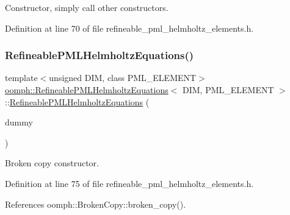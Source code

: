 Constructor, simply call other constructors. 



Definition at line 70 of file refineable\+\_\+pml\+\_\+helmholtz\+\_\+elements.\+h.

\mbox{\label{classoomph_1_1RefineablePMLHelmholtzEquations_a3ee7236f173edb1144cf75fd9f12e7b8}} 
\subsubsection{\texorpdfstring{Refineable\+P\+M\+L\+Helmholtz\+Equations()}{RefineablePMLHelmholtzEquations()}\hspace{0.1cm}{\footnotesize\ttfamily [2/2]}}
{\footnotesize\ttfamily template$<$unsigned D\+IM, class P\+M\+L\+\_\+\+E\+L\+E\+M\+E\+NT$>$ \\
\hyperlink{classoomph_1_1RefineablePMLHelmholtzEquations}{oomph\+::\+Refineable\+P\+M\+L\+Helmholtz\+Equations}$<$ D\+IM, P\+M\+L\+\_\+\+E\+L\+E\+M\+E\+NT $>$\+::\hyperlink{classoomph_1_1RefineablePMLHelmholtzEquations}{Refineable\+P\+M\+L\+Helmholtz\+Equations} (\begin{DoxyParamCaption}\item[{const \hyperlink{classoomph_1_1RefineablePMLHelmholtzEquations}{Refineable\+P\+M\+L\+Helmholtz\+Equations}$<$ D\+IM, P\+M\+L\+\_\+\+E\+L\+E\+M\+E\+NT $>$ \&}]{dummy }\end{DoxyParamCaption})\hspace{0.3cm}{\ttfamily [inline]}}



Broken copy constructor. 



Definition at line 75 of file refineable\+\_\+pml\+\_\+helmholtz\+\_\+elements.\+h.



References oomph\+::\+Broken\+Copy\+::broken\+\_\+copy().



